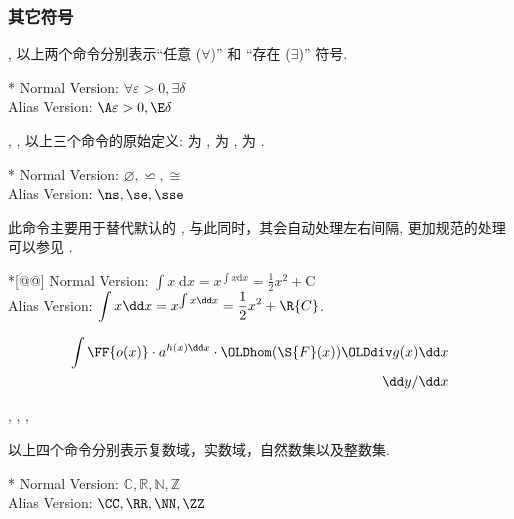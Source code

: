 \clearpage
\subsubsection{其它符号}
\begin{function}[updated=2024-12-05]{\A, \E}
  以上两个命令分别表示``任意 ($\forall$)'' 和 ``存在 ($\exists$)'' 符号.
\end{function}
\begin{DocExample}*
Normal Version: $\forall \varepsilon>0, \exists \delta$ \\
Alias Version: $\A \varepsilon>0, \E \delta$
\end{DocExample}

\begin{function}[updated=2024-12-05]{\ns, \se, \sse}
  以上三个命令的原始定义: \cmd{\ns} 为 ,  为 ,  为 .
\end{function}
\begin{DocExample}*
Normal Version: $\varnothing, \backsimeq, \cong$ \\
Alias Version: $\ns, \se, \sse$
\end{DocExample}


\begin{function}[updated=2024-12-05]{\dd}
  此命令主要用于替代默认的 , 与此同时，其会自动处理左右间隔, 更加规范的处理可以参见 .
\end{function}
\begin{DocExample}*[@@]
Normal Version: $\displaystyle\int x\;\mathrm{d}x = x^{\int x\mathrm{d} x } = \frac12x^2 + \mathrm{C}$ \\
Alias Version: $\displaystyle\int x\dd x = x^{\int x\dd x } = \frac12x^2 + \R{C}$.

\begin{align*}
  \int \FF{o(x)}\cdot a^{h(x)\dd x}\cdot\OLDhom(\S{F}(x))\OLDdiv g(x)\dd x\\
  \dd y/\dd x
\end{align*}
\end{DocExample}


\begin{function}[updated=2024-12-05]{\CC, \RR, \NN, \ZZ}
  \begin{syntax}
  \end{syntax}
  以上四个命令分别表示复数域，实数域，自然数集以及整数集.
\end{function}
\begin{DocExample}*
Normal Version: $\mathbb{C}, \mathbb{R}, \mathbb{N}, \mathbb{Z}$ \\
Alias Version: $\CC, \RR, \NN, \ZZ$
\end{DocExample}



